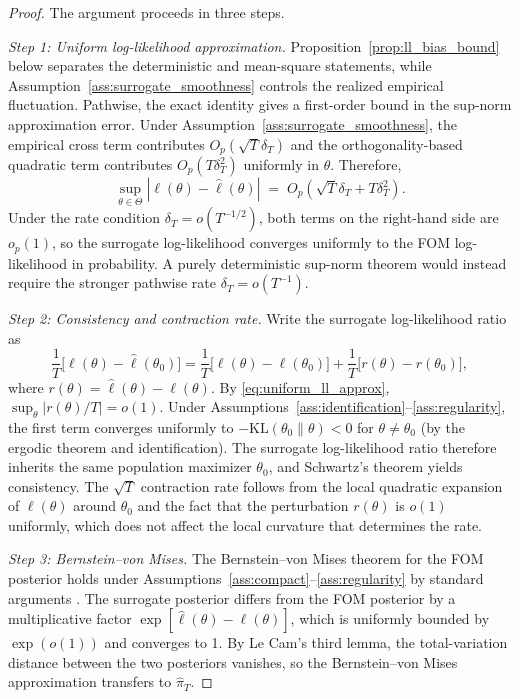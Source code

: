 \documentclass[12pt]{article}
\theoremstyle{plain}
\theoremstyle{definition}
\theoremstyle{remark}
\begin{document}
\begin{proof}
The argument proceeds in three steps.

\textit{Step 1: Uniform log-likelihood approximation.}
Proposition~\ref{prop:ll_bias_bound} below separates the deterministic and mean-square statements, while Assumption~\ref{ass:surrogate_smoothness} controls the realized empirical fluctuation. Pathwise, the exact identity gives a first-order bound in the sup-norm approximation error. Under Assumption~\ref{ass:surrogate_smoothness}, the empirical cross term contributes $O_p(\sqrt{T}\delta_T)$ and the orthogonality-based quadratic term contributes $O_p(T\delta_T^2)$ uniformly in $\theta$. Therefore,
\begin{equation}
\sup_{\theta \in \Theta}
  |\ell(\theta) - \hat{\ell}(\theta)|
  \;=\; O_p(\sqrt{T}\delta_T + T\delta_T^2).
\label{eq:uniform_ll_approx}
\end{equation}
Under the rate condition $\delta_T = o(T^{-1/2})$, both terms on the right-hand side are $o_p(1)$, so the surrogate log-likelihood converges uniformly to the FOM log-likelihood in probability. A purely deterministic sup-norm theorem would instead require the stronger pathwise rate $\delta_T=o(T^{-1})$.

\textit{Step 2: Consistency and contraction rate.}
Write the surrogate log-likelihood ratio as
\[
\frac{1}{T}\bigl[\hat{\ell}(\theta) - \hat{\ell}(\theta_0)\bigr]
= \frac{1}{T}\bigl[\ell(\theta) - \ell(\theta_0)\bigr]
  + \frac{1}{T}\bigl[r(\theta) - r(\theta_0)\bigr],
\]
where $r(\theta) = \hat{\ell}(\theta) - \ell(\theta)$. By \eqref{eq:uniform_ll_approx}, $\sup_\theta |r(\theta)/T| = o(1)$. Under Assumptions~\ref{ass:identification}--\ref{ass:regularity}, the first term converges uniformly to $-\text{KL}(\theta_0 \| \theta) < 0$ for $\theta \neq \theta_0$ (by the ergodic theorem and identification). The surrogate log-likelihood ratio therefore inherits the same population maximizer $\theta_0$, and Schwartz's theorem \citep{schwartz1965bayes} yields consistency. The $\sqrt{T}$ contraction rate follows from the local quadratic expansion of $\ell(\theta)$ around $\theta_0$ and the fact that the perturbation $r(\theta)$ is $o(1)$ uniformly, which does not affect the local curvature that determines the rate.

\textit{Step 3: Bernstein--von Mises.}
The Bernstein--von Mises theorem for the FOM posterior holds under Assumptions~\ref{ass:compact}--\ref{ass:regularity} by standard arguments \citep{van2000asymptotic}. The surrogate posterior differs from the FOM posterior by a multiplicative factor $\exp[\hat{\ell}(\theta) - \ell(\theta)]$, which is uniformly bounded by $\exp(o(1))$ and converges to 1. By Le Cam's third lemma, the total-variation distance between the two posteriors vanishes, so the Bernstein--von Mises approximation transfers to $\hat{\pi}_T$.
\end{proof}
\end{document}
